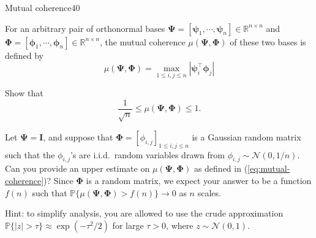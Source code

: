 \documentclass{article}
\begin{document}




\begin{problem}{Mutual coherence}{40}

For an arbitrary pair of orthonormal bases $\bm{\Psi}=[\bm{\psi}_1, \cdots, \bm{\psi}_n] \in \mathbb{R}^{n\times n}$ and $\bm{\Phi}=[\bm{\phi}_1,\cdots,\bm{\phi}_n] \in \mathbb{R}^{n\times n}$, the mutual coherence $\mu(\bm{\Psi}, \bm{\Phi})$ of these two bases is defined by 
\begin{equation}
  \mu(\bm{\Psi}, \bm{\Phi}) = \max_{1\leq i,j\leq n} \left| \bm{\psi}_i^{\top} \bm{\phi}_j  \right| \label{eq:mutual-coherence}
\end{equation}


Show that 
\[
  \frac{1}{\sqrt{n}} \leq \mu(\bm{\Psi}, \bm{\Phi}) \leq 1.
\]


Let $\bm{\Psi} = \bm{I}$, and suppose that $\bm{\Phi} = [\phi_{i,j}]_{1\leq i,j\leq n}$ is a Gaussian random matrix such that the $\phi_{i,j}$'s are i.i.d.~random variables drawn from $\phi_{i,j} \sim \mathcal{N}(0, 1/n)$.  Can you provide an upper estimate on $\mu(\bm{\Psi}, \bm{\Phi})$ as defined in (\ref{eq:mutual-coherence})?  Since $\bm{\Phi}$ is a random matrix, we expect your answer to be a function $f(n)$ such that $\mathbb{P}\{\mu(\bm{\Psi}, \bm{\Phi}) > f(n)\} \rightarrow 0$ as $n$ scales. 

\vspace{0.5em}
Hint: to simplify analysis, you are allowed to use the  crude approximation $\mathbb{P}\{ |z| > \tau\} \approx  \exp( - \tau^2 /2 )$ for large $\tau >0$, where $z\sim \mathcal{N}(0,1)$.


\end{problem}
\end{document}
